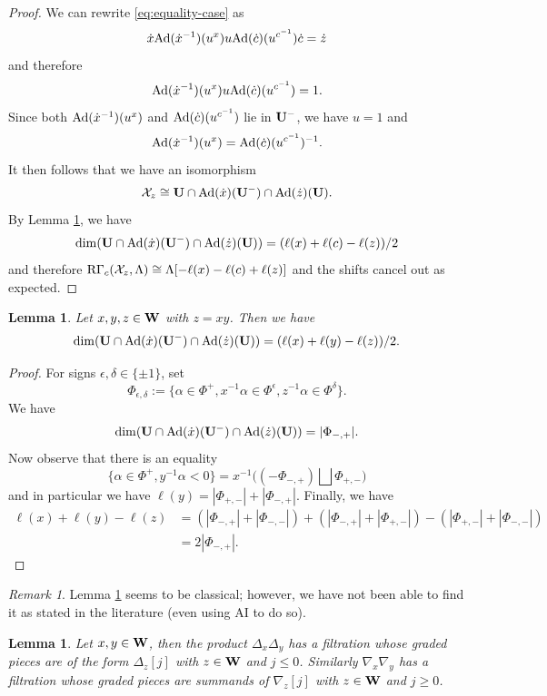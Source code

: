 \documentclass[article, 10pt, oneside, reqno]{amsart}
\theoremstyle{plain}
\newtheorem{lem}[thm]{Lemma}
\theoremstyle{definition}
\theoremstyle{remark}
\newtheorem{rque}[thm]{Remark}
\begin{document}
\begin{proof}
We can rewrite \eqref{eq:equality-case} as 
$$\dot{x} \mathrm{Ad}(\dot{x}^{-1})(u^x) u \mathrm{Ad}(\dot{c})(u^{c^{-1}}) \dot{c} = \dot{z}$$
and therefore
\[\mathrm{Ad}(\dot{x}^{-1})(u^x) u \mathrm{Ad}(\dot{c})(u^{c^{-1}}) = 1.\]
Since both $\mathrm{Ad}(\dot{x}^{-1})(u^x)$ and $\mathrm{Ad}(\dot{c})(u^{c^{-1}})$ lie in $\mathbf{U}^-$, we have $u = 1$ and 
$$\mathrm{Ad}(\dot{x}^{-1})(u^x) = \mathrm{Ad}(\dot{c})(u^{c^{-1}})^{-1}.$$
It then follows that we have an isomorphism 
$$\mathcal{X}_z \cong \mathbf{U} \cap \mathrm{Ad}(\dot{x})(\mathbf{U}^-) \cap \mathrm{Ad}(\dot{z})(\mathbf{U}).$$
By Lemma \ref{lem:lenght-intersection-of-unip-groups}, we have 
$$\dim(\mathbf{U} \cap \mathrm{Ad}(\dot{x})(\mathbf{U}^-) \cap \mathrm{Ad}(\dot{z})(\mathbf{U})) = (\ell(x) + \ell(c) - \ell(z))/2$$ 
and therefore $\mathrm{R\Gamma}_c(\mathcal{X}_z, \Lambda) \cong \Lambda[-\ell(x) - \ell(c) + \ell(z)]$ and the shifts cancel out as expected.
\end{proof}

\begin{lem}\label{lem:lenght-intersection-of-unip-groups}
Let $x,y,z \in \mathbf{W}$ with $z = xy$. Then we have 
$$\dim(\mathbf{U} \cap \mathrm{Ad}(\dot{x})(\mathbf{U}^-) \cap \mathrm{Ad}(\dot{z})(\mathbf{U})) = (\ell(x) + \ell(y) - \ell(z))/2.$$
\end{lem}

\begin{proof}
For signs $\epsilon, \delta \in \{\pm 1\}$, set 
$$\Phi_{\epsilon,\delta} := \{\alpha \in \Phi^+, x^{-1}\alpha \in \Phi^{\epsilon}, z^{-1}\alpha \in \Phi^{\delta}\}.$$
We have 
$$\dim(\mathbf{U} \cap \mathrm{Ad}(\dot{x})(\mathbf{U}^-) \cap \mathrm{Ad}(\dot{z})(\mathbf{U})) = |\Phi_{-,+}|.$$
Now observe that there is an equality 
$$\{\alpha \in \Phi^+, y^{-1}\alpha < 0 \} = x^{-1}\bigl((-\Phi_{-,+}) \bigsqcup \Phi_{+,-}\bigr)$$
and in particular we have $\ell(y) = |\Phi_{+,-}| + |\Phi_{-,+}|$. 
Finally, we have
\begin{align*}
\ell(x) + \ell(y) - \ell(z) &= (|\Phi_{-,+}| + |\Phi_{-,-}|) + (|\Phi_{-,+}| + |\Phi_{+,-}|) - (|\Phi_{+,-}| + |\Phi_{-,-}|) \\
&= 2|\Phi_{-,+}|.
\end{align*}
\end{proof}

\begin{rque}
Lemma \ref{lem:lenght-intersection-of-unip-groups} seems to be classical; however, we have not been able to find it as stated in the literature (even using AI to do so). 
\end{rque}

\begin{lem}\label{lem:filtration-product-of-delta-bis}
Let $x,y \in \mathbf{W}$, then the product $\Delta_x\Delta_y$ has a filtration whose graded pieces are of the form $\Delta_z[j]$ with $z \in \mathbf{W}$ and $j \leq 0$. Similarly $\nabla_x\nabla_y$ has a filtration whose graded pieces are summands of $\nabla_z[j]$ with $z \in \mathbf{W}$ and $j \geq 0$.
\end{lem}
\end{document}
